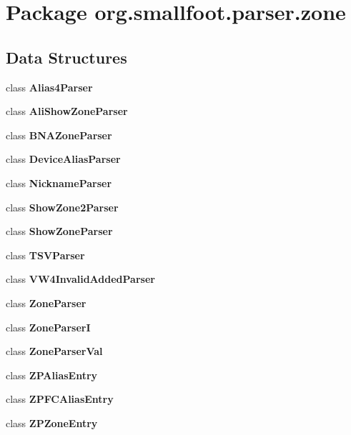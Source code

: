\section{Package org.\+smallfoot.\+parser.\+zone}
\label{namespaceorg_1_1smallfoot_1_1parser_1_1zone}
\subsection*{Data Structures}
\begin{DoxyCompactItemize}
\item 
class {\bf Alias4\+Parser}
\item 
class {\bf Ali\+Show\+Zone\+Parser}
\item 
class {\bf B\+N\+A\+Zone\+Parser}
\item 
class {\bf Device\+Alias\+Parser}
\item 
class {\bf Nickname\+Parser}
\item 
class {\bf Show\+Zone2\+Parser}
\item 
class {\bf Show\+Zone\+Parser}
\item 
class {\bf T\+S\+V\+Parser}
\item 
class {\bf V\+W4\+Invalid\+Added\+Parser}
\item 
class {\bf Zone\+Parser}
\item 
class {\bf Zone\+Parser\+I}
\item 
class {\bf Zone\+Parser\+Val}
\item 
class {\bf Z\+P\+Alias\+Entry}
\item 
class {\bf Z\+P\+F\+C\+Alias\+Entry}
\item 
class {\bfseries Z\+P\+Zone\+Entry}
\end{DoxyCompactItemize}
